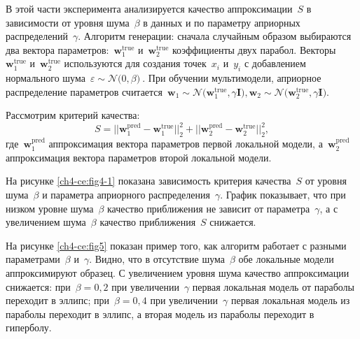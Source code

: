 В этой части эксперимента анализируется качество аппроксимации~$S$ в зависимости от уровня шума~$\beta$ в данных и по параметру априорных распределений~$\gamma$. Алгоритм генерации: сначала случайным образом выбираются два вектора параметров:~$\mathbf{w}^\text{true}_{1}$ и~$\mathbf{w}^\text{true}_{2}$ коэффициенты двух парабол. Векторы~$\mathbf{w}^\text{true}_{1}$ и~$\mathbf{w}^\text{true}_{2}$ используются для создания точек~$x_i$ и~$y_i$ с добавлением нормального шума~$\varepsilon\sim\mathcal{N}\bigr(0, \beta\bigr)~$. При обучении мультимодели, априорное распределение параметров считается~$\mathbf{w}_1\sim\mathcal{N}\bigr(\mathbf{w}^\text{true}_{1}, \gamma\mathbf{I}\bigr), \mathbf{w}_2\sim\mathcal{N}\bigr(\mathbf{w}^\text{true}_{2},\gamma\mathbf{I}\bigr)$.

Рассмотрим критерий качества:
\[
S = ||\mathbf{w}^\text{pred}_{1} - \mathbf{w}^\text{true}_{1}||^{2}_{2} + ||\mathbf{w}^\text{pred}_{2} - \mathbf{w}^\text{true}_{2}||^{2}_{2},
\]
где~$\mathbf{w}^\text{pred}_{1}$ аппроксимация вектора параметров первой локальной модели, а~$\mathbf{w}^\text{pred}_{2}~$ аппроксимация вектора параметров второй локальной модели.

На рисунке \ref{ch4-ce:fig4-1} показана зависимость критерия качества~$S$ от уровня шума~$\beta$ и параметра априорного распределения~$\gamma$. График показывает, что при низком уровне шума~$\beta$ качество приближения не зависит от параметра~$\gamma$, а с увеличением шума~$\beta$ качество приближения~$S$ снижается.

На рисунке \ref{ch4-ce:fig5} показан пример того, как алгоритм работает с разными параметрами~$\beta$ и~$\gamma$. Видно, что в отсутствие шума~$\beta$ обе локальные модели аппроксимируют образец. С увеличением уровня шума качество аппроксимации снижается: при~$\beta = 0{,}2$ при увеличении~$\gamma$ первая локальная модель от параболы переходит в эллипс; при~$\beta = 0{,}4$ при увеличении~$\gamma$ первая локальная модель из параболы переходит в эллипс, а вторая модель из параболы переходит в гиперболу.

